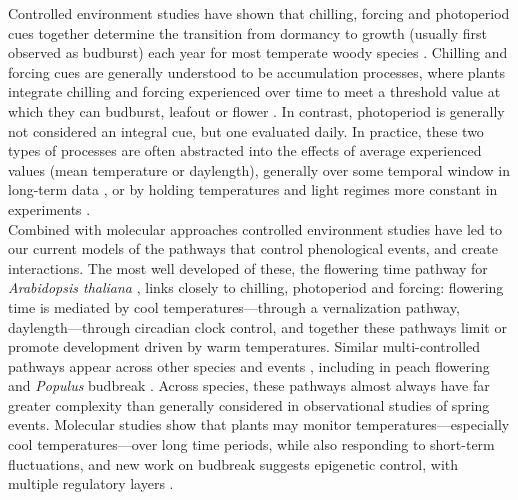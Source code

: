 \documentclass[11pt,letter]{article}
\begin{document}
Controlled environment studies have shown that chilling, forcing and photoperiod cues together determine the transition from dormancy to growth (usually first observed as budburst) each year for most temperate woody species \citep{vanderschoot2014,chuinearees,Singh:2017,chang2021}. Chilling and forcing cues are generally understood to be accumulation processes, where plants integrate chilling and forcing experienced over time to meet a threshold value at which they can budburst, leafout or flower \citep{chuinearees}. In contrast, photoperiod is generally not considered an integral cue, but one evaluated daily. In practice, these two types of processes are often abstracted into the effects of average experienced values (mean temperature or daylength), generally over some temporal window in long-term data \citep[e.g.,][]{Wolkovich:2012n,fu2015}, or by holding temperatures and light regimes more constant in experiments \citep[e.g.,][]{Worrall:1967aa,Heide:1993,Skuterud:1994aa}. \\ %

 Combined with molecular approaches controlled environment studies have led to our current models of the pathways that control phenological events, and create interactions. The most well developed of these, the flowering time pathway for \emph{Arabidopsis thaliana} \citep[reviewed in][]{Satake2022}, links closely to chilling, photoperiod and forcing: flowering time is mediated by cool temperatures---through a vernalization pathway, daylength---through circadian clock control, and together these pathways limit or promote development driven by warm temperatures. Similar multi-controlled pathways appear across other species and events \citep{Maurya2017,Satake2022}, including in peach flowering and \emph{Populus} budbreak \citep{Azeez2021}. Across species, these pathways almost always have far greater complexity than generally considered in observational studies of spring events. Molecular studies show that plants may monitor temperatures---especially cool temperatures---over long time periods, while also responding to short-term fluctuations, and new work on budbreak suggests epigenetic control, with multiple regulatory layers \citep{Azeez2021}.
\end{document}
